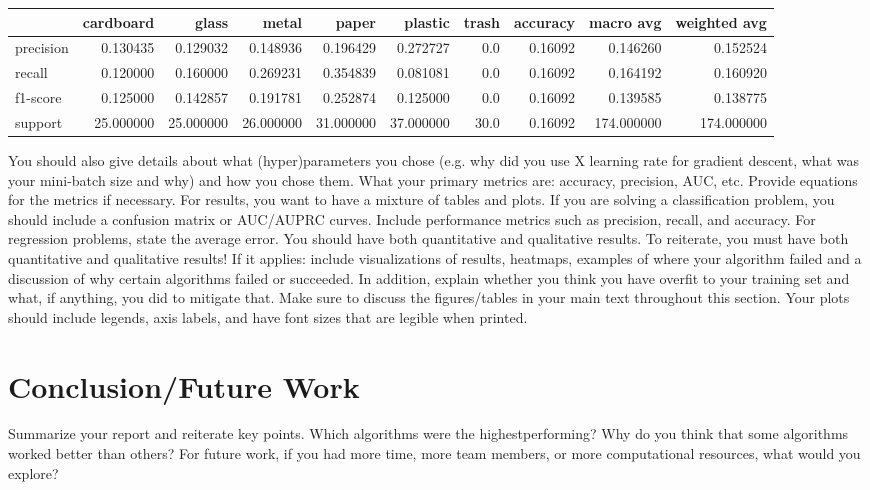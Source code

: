 \documentclass{article}
\begin{document}
\begin{tabular}{lrrrrrrrrr}
\toprule{} &  cardboard &      glass &      metal &      paper &    plastic &  trash &  accuracy &   macro avg &  weighted avg \\
\midrule
precision &   0.130435 &   0.129032 &   0.148936 &   0.196429 &   0.272727 &    0.0 &   0.16092 &    0.146260 &      0.152524 \\
recall    &   0.120000 &   0.160000 &   0.269231 &   0.354839 &   0.081081 &    0.0 &   0.16092 &    0.164192 &      0.160920 \\
f1-score  &   0.125000 &   0.142857 &   0.191781 &   0.252874 &   0.125000 &    0.0 &   0.16092 &    0.139585 &      0.138775 \\
support   &  25.000000 &  25.000000 &  26.000000 &  31.000000 &  37.000000 &   30.0 &   0.16092 &  174.000000 &    174.000000 \\
\bottomrule
\end{tabular}

You should also give details about what (hyper)parameters you chose (e.g. why did you
use X learning rate for gradient descent, what was your mini-batch size and why) and how
you chose them. What your primary metrics are: accuracy, precision,
AUC, etc. Provide equations for the metrics if necessary. For results, you want to have a
mixture of tables and plots. If you are solving a classification problem, you should include a
confusion matrix or AUC/AUPRC curves. Include performance metrics such as precision,
recall, and accuracy. For regression problems, state the average error. You should have
both quantitative and qualitative results. To reiterate, you must have both quantitative
and qualitative results! If it applies: include visualizations of results, heatmaps,
examples of where your algorithm failed and a discussion of why certain algorithms failed
or succeeded. In addition, explain whether you think you have overfit to your training set
and what, if anything, you did to mitigate that. Make sure to discuss the figures/tables in
your main text throughout this section. Your plots should include legends, axis labels, and
have font sizes that are legible when printed.



\section{Conclusion/Future Work }
Summarize your report and reiterate key points. Which algorithms were the highestperforming?
Why do you think that some algorithms worked better than others? For
future work, if you had more time, more team members, or more computational resources,
what would you explore?
\end{document}
